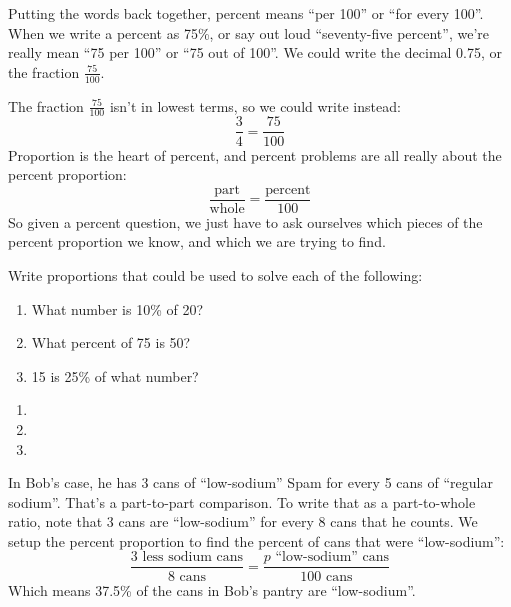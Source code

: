 Putting the words back together, percent means ``per 100'' or ``for every 100''. When we write a percent as 75\%, or say out loud ``seventy-five percent'', we're really mean ``75 per 100'' or ``75 out of 100''. We could write the decimal 0.75, or the fraction $\frac{75}{100}$.

The fraction $\frac{75}{100}$ isn't in lowest terms, so we could write instead: \[\frac{3}{4} = \frac{75}{100}\]
Proportion is the heart of percent, and percent problems are all really about the percent proportion: \[\frac{\text{part}}{\text{whole}} = \frac{\text{percent}}{100}\]
So given a percent question, we just have to ask ourselves which pieces of the percent proportion we know, and which we are trying to find.

\begin{boxex}
Write proportions that could be used to solve each of the following:
\begin{enumerate}
	\item What number is 10\% of 20?
	\item What percent of 75 is 50?
	\item 15 is 25\% of what number?
\end{enumerate}

\expsoln
\begin{enumerate}
	\item {}

	\item {}

	\item {}
\end{enumerate}
\end{boxex}

In Bob's case, he has 3 cans of ``low-sodium'' Spam for every 5 cans of ``regular sodium''. That's a part-to-part comparison. To write that as a part-to-whole ratio, note that 3 cans are ``low-sodium'' for every 8 cans that he counts. We setup the percent proportion to find the percent of cans that were ``low-sodium'':
\[\frac{3\text{ less sodium cans}}{8 \text{ cans}} = \frac{p \text{ ``low-sodium'' cans}}{100 \text{ cans}}\]
Which means 37.5\% of the cans in Bob's pantry are ``low-sodium''.

